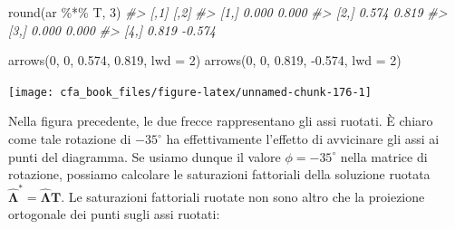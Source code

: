 \documentclass[
  11pt,
]{krantz}
\makeatletter
\newenvironment{Shaded}{\begin{snugshade}}{\end{snugshade}}
\newcommand{\AttributeTok}[1]{\textcolor[rgb]{0.61,0.61,0.61}{#1}}
\newcommand{\CommentTok}[1]{\textcolor[rgb]{0.37,0.37,0.37}{\textit{#1}}}
\newcommand{\ConstantTok}[1]{\textcolor[rgb]{0,0,0}{#1}}
\newcommand{\DecValTok}[1]{\textcolor[rgb]{0.06,0.06,0.06}{#1}}
\newcommand{\FloatTok}[1]{\textcolor[rgb]{0.06,0.06,0.06}{#1}}
\newcommand{\FunctionTok}[1]{\textcolor[rgb]{0,0,0}{#1}}
\newcommand{\NormalTok}[1]{#1}
\newcommand{\OtherTok}[1]{\textcolor[rgb]{0.37,0.37,0.37}{#1}}
\newcommand{\SpecialCharTok}[1]{\textcolor[rgb]{0,0,0}{#1}}
\newenvironment{kframe}{%
\medskip{}
\setlength{\fboxsep}{.8em}
 \def\at@end@of@kframe{}%
 \ifinner\ifhmode%
  \def\at@end@of@kframe{\end{minipage}}%
  \begin{minipage}{\columnwidth}%
 \fi\fi%
 \def\FrameCommand##1{\hskip\@totalleftmargin \hskip-\fboxsep
 \colorbox{shadecolor}{##1}\hskip-\fboxsep
     \hskip-\linewidth \hskip-\@totalleftmargin \hskip\columnwidth}%
 \MakeFramed {\advance\hsize-\width
   \@totalleftmargin\z@ \linewidth\hsize
   \@setminipage}}%
 {\par\unskip\endMakeFramed%
 \at@end@of@kframe}
\renewenvironment{Shaded}{\begin{kframe}}{\end{kframe}}
\theoremstyle{definition}
\theoremstyle{definition}
\theoremstyle{definition}
\theoremstyle{definition}
\theoremstyle{remark}
\makeatother
\begin{document}
\begin{Shaded}
\begin{Highlighting}[]
\FunctionTok{round}\NormalTok{(ar }\SpecialCharTok{\%*\%}\NormalTok{ T, }\DecValTok{3}\NormalTok{)}
\CommentTok{\#\textgreater{}       [,1]   [,2]}
\CommentTok{\#\textgreater{} [1,] 0.000  0.000}
\CommentTok{\#\textgreater{} [2,] 0.574  0.819}
\CommentTok{\#\textgreater{} [3,] 0.000  0.000}
\CommentTok{\#\textgreater{} [4,] 0.819 {-}0.574}

\FunctionTok{arrows}\NormalTok{(}\DecValTok{0}\NormalTok{, }\DecValTok{0}\NormalTok{, }\FloatTok{0.574}\NormalTok{, }\FloatTok{0.819}\NormalTok{, }\AttributeTok{lwd =} \DecValTok{2}\NormalTok{)}
\FunctionTok{arrows}\NormalTok{(}\DecValTok{0}\NormalTok{, }\DecValTok{0}\NormalTok{, }\FloatTok{0.819}\NormalTok{, }\SpecialCharTok{{-}}\FloatTok{0.574}\NormalTok{, }\AttributeTok{lwd =} \DecValTok{2}\NormalTok{)}
\end{Highlighting}
\end{Shaded}

\begin{center}\texttt{[image: cfa\_book\_files/figure-latex/unnamed-chunk-176-1]} \end{center}

Nella figura precedente, le due frecce rappresentano gli assi ruotati. È chiaro come tale rotazione di \(-35^{\circ}\) ha effettivamente l'effetto di avvicinare gli assi ai punti del diagramma. Se usiamo dunque il valore \(\phi = -35^{\circ}\) nella matrice di rotazione, possiamo calcolare le saturazioni fattoriali della soluzione ruotata \(\hat{\boldsymbol{\Lambda}}^* = \hat{\boldsymbol{\Lambda}} \textbf{T}\). Le saturazioni fattoriali ruotate non sono altro che la proiezione ortogonale dei punti sugli assi ruotati:

\begin{Shaded}
\end{Shaded}
\end{document}
